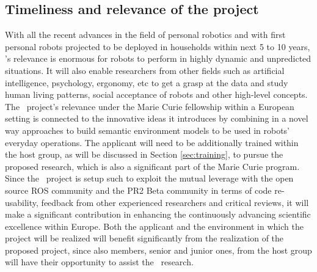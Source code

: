 \subsection{Timeliness and relevance of the project}
With all the recent advances in the field of personal robotics and with first
personal robots projected to be deployed in households within next 5 to 10 years, 
\ksem's relevance is enormous for robots to perform in highly dynamic and unpredicted
situations. It will also enable researchers from other fields such as artificial intelligence, 
psychology, ergonomy, etc to get a grasp at the data and study human living patterns, 
social acceptance of robots and other high-level concepts.
The \ksem\ project's relevance under the Marie Curie fellowship within a European 
setting is connected to the innovative ideas it introduces by combining in a novel way 
approaches to build semantic environment models to be used in robots' everyday operations.
The applicant will need to be additionally trained within the host group, as will be discussed in Section 
\ref{sec:training}, to pursue the proposed research, which is also a significant part of the Marie Curie program.
Since the \ksem\ project is setup such to exploit the mutual leverage with the open source ROS 
community and the PR2 Beta community 
in terms of code re-usability, feedback from other experienced researchers and critical reviews, 
it will make a significant contribution in enhancing the continuously advancing scientific excellence within Europe. 
Both the applicant and the  environment in which the project will be realized will benefit significantly from the 
realization of the proposed project, since also members, senior and junior ones, from the 
host group will have their opportunity to assist the \ksem\ research. \\

